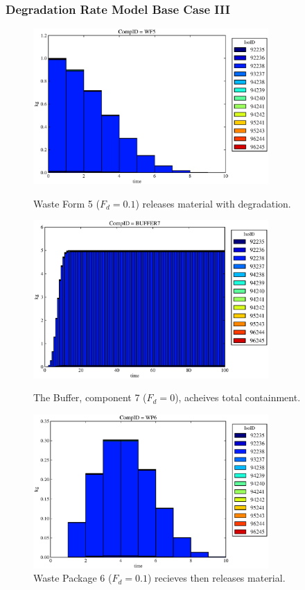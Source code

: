 \begin{frame}
  \frametitle{Degradation Rate Model Base Case III}
  \begin{figure}
\begin{minipage}[b]{0.45\linewidth}

  \includegraphics[width=0.8\textwidth]{./images/drIII1.eps}
  \caption[DRIII Waste Form Contaminants.]{
    Waste Form 5 ($F_d = 0.1$) releases material with degradation. 
    }
  \label{fig:drIIIwf5}
  
  \includegraphics[width=0.8\textwidth]{./images/drIII3.eps}
  \caption[Case DRIII Buffer Contaminants]{
    The Buffer, component 7 ($F_d=0$), acheives total containment.
    }
  \label{fig:drIIIbuff}

\end{minipage}
\hspace{0.05\linewidth}
\begin{minipage}[b]{0.45\linewidth}
  \includegraphics[width=0.8\textwidth]{./images/drIII2.eps}
  \caption[Case DRIII Waste Package Contaminants.]{ 
    Waste Package 6 ($F_d = 0.1$) recieves then releases material. 
    }
  \label{fig:drIIIwp6}


\end{minipage}
\end{figure}
\end{frame}
